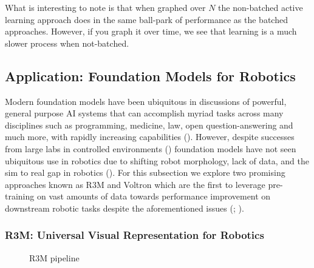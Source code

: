 \documentclass[
  letterpaper,
  numbers=noenddot,
  DIV=11]{scrreprt}
\theoremstyle{definition}
\theoremstyle{plain}
\theoremstyle{plain}
\theoremstyle{remark}
\begin{document}
What is interesting to note is that when graphed over \(N\) the
non-batched active learning approach does in the same ball-park of
performance as the batched approaches. However, if you graph it over
time, we see that learning is a much slower process when not-batched.

\subsection{Application: Foundation Models for
Robotics}\label{application-foundation-models-for-robotics}

Modern foundation models have been ubiquitous in discussions of
powerful, general purpose AI systems that can accomplish myriad tasks
across many disciplines such as programming, medicine, law, open
question-answering and much more, with rapidly increasing capabilities
().
However, despite successes from large labs in controlled environments
() foundation models
have not seen ubiquitous use in robotics due to shifting robot
morphology, lack of data, and the sim to real gap in robotics
(). For this
subsection we explore two promising approaches known as R3M and Voltron
which are the first to leverage pre-training on vast amounts of data
towards performance improvement on downstream robotic tasks despite the
aforementioned issues (;
).

\subsubsection*{R3M: Universal Visual Representation for
Robotics}\label{r3m-universal-visual-representation-for-robotics}

\begin{figure}


\caption{\label{fig-r3m-pipline}R3M pipeline}

\end{figure}%
\end{document}
